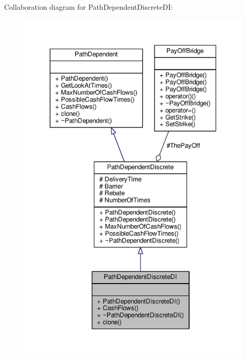 Collaboration diagram for Path\+Dependent\+Discrete\+DI\+:
\nopagebreak
\begin{figure}[H]
\begin{center}
\leavevmode
\includegraphics[width=340pt]{classPathDependentDiscreteDI__coll__graph}
\end{center}
\end{figure}
